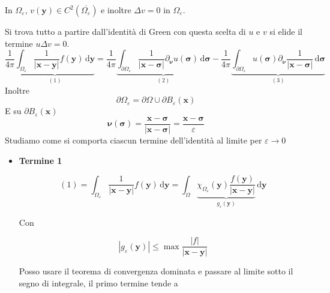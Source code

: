\documentclass[10pt,a4paper,twoside,openright]{book}
\newcommand{\x}{\mathbf{x}}
\newcommand{\y}{\mathbf{y}}
\newcommand{\sigg}{\bm{\sigma}}
\newcommand{\nuu}{\bm{\nu}}
\newcommand{\de}{\,\mathrm d}
\newcommand{\dyy}{\de \y}
\newcommand{\dsig}{\de \sigg}
\begin{document}
\begin{dimostrazione}
\begin{figure}[H]
\begin{tikzpicture}[x=0.75pt,y=0.75pt,yscale=-1,xscale=1]
        \end{tikzpicture}
    \end{figure}
    \FloatBarrier

    In $\displaystyle \Omega _{\varepsilon }$, $\displaystyle v(\y) \in C^{2}\left(\overline{\Omega _{\varepsilon }}\right)$ e inoltre $\displaystyle \Delta v=0$ in $\displaystyle \Omega _{\varepsilon }$.

    Si trova tutto a partire dall'identità di Green con questa scelta di $u$ e $v$ si elide il termine $\displaystyle u\Delta v=0$.
    \begin{equation*}
        \frac{1}{4\pi }\underbrace{\int _{\Omega _{\varepsilon }}\frac{1}{| \x -\y| } f(\y) \dyy}_{(1)} =\frac{1}{4\pi }\underbrace{\int _{\partial \Omega _{\varepsilon }}\frac{1}{| \x -\sigg| } \partial _{\nuu} u(\sigg) \dsig}_{(2)} -\frac{1}{4\pi }\underbrace{\int _{\partial \Omega _{\varepsilon }} u(\sigg) \partial _{\nuu}\frac{1}{| \x -\sigg| } \dsig}_{(3)}
    \end{equation*}
    Inoltre
    \begin{equation*}
        \partial \Omega _{\varepsilon } =\partial \Omega \cup \partial B_{\varepsilon }(\x)
    \end{equation*}
    E su $\displaystyle \partial B_{\varepsilon }(\x)$
    \begin{equation*}
        \nuu(\sigg) =\frac{\x -\sigg}{| \x -\sigg| } =\frac{\x -\sigg}{\varepsilon }
    \end{equation*}
    Studiamo come si comporta ciascun termine dell'identità al limite per $\displaystyle \varepsilon \rightarrow 0$
    \begin{itemize}
        \item \textbf{Termine 1}

              \begin{equation*}
                  (1) =\int _{\Omega _{\varepsilon }}\frac{1}{| \x -\y| } f(\y) \dyy =\int _{\Omega }\underbrace{\chi _{\Omega _{\varepsilon }}(\y)\frac{f(\y)}{| \x -\y| }}_{g_{\varepsilon }(\y)} \dyy
              \end{equation*}

              Con

              \begin{equation*}
                  | g_{\varepsilon }(\y)| \leqslant \max\frac{| f| }{| \x -\y| }
              \end{equation*}

              Posso usare il teorema di convergenza dominata e passare al limite sotto il segno di integrale, il primo termine tende a


\end{itemize}
\end{dimostrazione}
\end{document}
